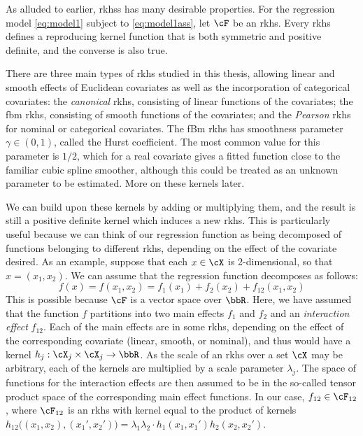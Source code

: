 As alluded to earlier, \glspl{rkhs} has many desirable properties.
For the regression model \eqref{eq:model1} subject to \eqref{eq:model1ass}, let $\cF$ be an \gls{rkhs}. 
Every \gls{rkhs} defines a reproducing kernel function that is both symmetric and positive definite, and the converse is also true.


There are three main types of \gls{rkhs} studied in this thesis, allowing linear and smooth effects of Euclidean covariates as well as the incorporation of categorical covariates: the {\em canonical} \gls{rkhs}, consisting of linear functions of the covariates; the \gls{fbm} \gls{rkhs}, consisting of smooth functions of the covariates; and the {\em Pearson} \gls{rkhs} for nominal or categorical covariates. 
The fBm \gls{rkhs} has smoothness parameter $\gamma \in (0,1)$, called the Hurst coefficient.
The most common value for this parameter is $1/2$, which for a real covariate gives a fitted function close to the familiar cubic spline smoother, although this could be treated as an unknown parameter to be estimated. 
More on these kernels later.


We can build upon these kernels by adding or multiplying them, and the result is still a positive definite kernel which induces a new \gls{rkhs}.
This is particularly useful because we can think of our regression function as being decomposed of functions belonging to different \gls{rkhs}, depending on the effect of the covariate desired.
As an example, suppose that each $x \in \cX$ is 2-dimensional, so that $x = (x_1, x_2)$.
We can assume that the regression function decomposes as follows:
\[
  f(x) = f(x_1, x_2) = f_1(x_1) + f_2(x_2) + f_{12}(x_1, x_2)
\]
This is possible because $\cF$ is a vector space over $\bbR$. 
Here, we have assumed that the function $f$ partitions into two main effects $f_1$ and $f_2$ and an \emph{interaction effect} $f_{12}$. 
Each of the main effects are in some \gls{rkhs}, depending on the effect of the corresponding covariate (linear, smooth, or nominal), and thus would have a kernel $h_j:\cX_j \times \cX_j \to \bbR$.
As the scale of an \gls{rkhs} over a set $\cX$ may be arbitrary, each of the kernels are multiplied by a scale parameter $\lambda_j$.
The space of functions for the interaction effects are then assumed to be in the so-called tensor product space of the corresponding main effect functions.
In our case, $f_{12} \in \cF_{12}$, where $\cF_{12}$ is an \gls{rkhs} with kernel equal to the product of kernels $h_{12}\big((x_1, x_2),(x_1',x_2')\big) = \lambda_1\lambda_2 \cdot h_1(x_1,x_1')h_2(x_2,x_2')$.


